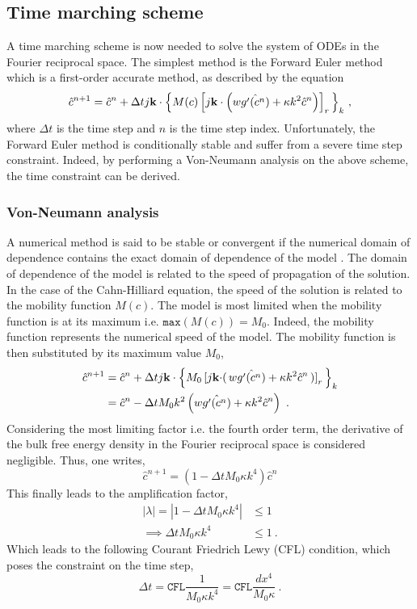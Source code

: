 \subsection{Time marching scheme}
    A time marching scheme is now needed to solve the system of ODEs in the Fourier reciprocal space. The simplest method is the Forward Euler method which is a first-order accurate method, as described by the equation
    \begin{equation}
        \hat{c}^{n+1} = \hat{c}^n + \Delta t j\mathbf{k} \cdot \Bigl\{ M(c) \left[j\mathbf{k} \cdot \left(w\hat{g'(c^n)} + \kappa k^2 \hat{c}^n\right)\right]_r \Bigl\}_k\ ,
    \end{equation}
    where $\Delta t$ is the time step and $n$ is the time step index.
    Unfortunately, the Forward Euler method is conditionally stable and suffer from a severe time step constraint. Indeed, by performing a Von-Neumann analysis on the above scheme, the time constraint can be derived.
    \subsubsection{Von-Neumann analysis}
    A numerical method is said to be stable or convergent if the numerical domain of dependence contains the exact domain of dependence of the model \cite{Olver2014}. The domain of dependence of the model is related to the speed of propagation of the solution. In the case of the Cahn-Hilliard equation, the speed of the solution is related to the mobility function $M(c)$. 
    The model is most limited when the mobility function is at its maximum i.e. $\texttt{max}(M(c)) = M_0$. Indeed, the mobility function represents the numerical speed of the model. The mobility function is then substituted by its maximum value $M_0$, 
    \begin{align*}
        \hat{c}^{n+1} &= \hat{c}^n + \Delta t j\mathbf{k} \cdot \Bigl\{ M_0 \left[j\mathbf{k} \cdot \right(w\hat{g'(c^n)} + \kappa k^2 \hat{c}^n\left)\right]_r \Bigl\}_k\\
        &= \hat{c}^n - \Delta t M_0 k^2 \left(w\hat{g'(c^n)} + \kappa k^2 \hat{c}^n \right)\ .
    \end{align*}
    Considering the most limiting factor i.e. the fourth order term, the derivative of the bulk free energy density in the Fourier reciprocal space is considered negligible. Thus, one writes,
    \begin{equation*}
        \hat{c}^{n+1} = \left(1 - \Delta t M_0 \kappa k^4 \right) \hat{c}^n
    \end{equation*}
    This finally leads to the amplification factor,
    \begin{align*}
        |\lambda| = |1 - \Delta t M_0 \kappa k^4| &\leq 1\\
        \implies \Delta t M_0 \kappa k^4 &\leq 1\ .
    \end{align*}
    Which leads to the following Courant Friedrich Lewy (CFL) condition, which poses the constraint on the time step,
    \begin{equation}\label{eq:2-cfl}
        \Delta t = \texttt{CFL} \frac{1}{M_0 \kappa k^4} = \texttt{CFL} \frac{dx^4}{M_0 \kappa}\ .
    \end{equation}
